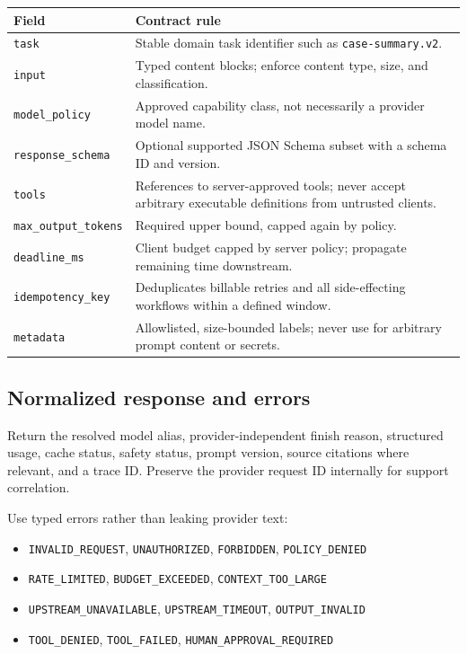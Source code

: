 \documentclass[10pt]{article}
\newcommand{\code}[1]{\texttt{#1}}
\begin{document}
\begin{keybox}
\small
\begin{tabularx}{\textwidth}{P{0.25\textwidth} Y}
\textbf{Field} & \textbf{Contract rule} \\
\midrule
\code{task} & Stable domain task identifier such as \code{case-summary.v2}. \\
\code{input} & Typed content blocks; enforce content type, size, and classification. \\
\code{model\_policy} & Approved capability class, not necessarily a provider model name. \\
\code{response\_schema} & Optional supported JSON Schema subset with a schema ID and version. \\
\code{tools} & References to server-approved tools; never accept arbitrary executable definitions from untrusted clients. \\
\code{max\_output\_tokens} & Required upper bound, capped again by policy. \\
\code{deadline\_ms} & Client budget capped by server policy; propagate remaining time downstream. \\
\code{idempotency\_key} & Deduplicates billable retries and all side-effecting workflows within a defined window. \\
\code{metadata} & Allowlisted, size-bounded labels; never use for arbitrary prompt content or secrets. \\
\end{tabularx}
\end{keybox}

\subsection{Normalized response and errors}

Return the resolved model alias, provider-independent finish reason, structured usage, cache status, safety status, prompt version, source citations where relevant, and a trace ID. Preserve the provider request ID internally for support correlation.

Use typed errors rather than leaking provider text:

\begin{itemize}
  \item \code{INVALID\_REQUEST}, \code{UNAUTHORIZED}, \code{FORBIDDEN}, \code{POLICY\_DENIED}
  \item \code{RATE\_LIMITED}, \code{BUDGET\_EXCEEDED}, \code{CONTEXT\_TOO\_LARGE}
  \item \code{UPSTREAM\_UNAVAILABLE}, \code{UPSTREAM\_TIMEOUT}, \code{OUTPUT\_INVALID}
  \item \code{TOOL\_DENIED}, \code{TOOL\_FAILED}, \code{HUMAN\_APPROVAL\_REQUIRED}
\end{itemize}
\end{document}
